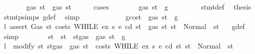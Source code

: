 \begin{isabellebody}
\ \ \ \ \isamarkupfalse%
\ \isamarkupfalse%
\ {\isachardoublequoteopen}gas\ st{}{\isacharprime}{\kern0pt}\ {\isasymle}\ gas\ st{\isachardoublequoteclose}\isanewline
\ \ \ \ \isamarkupfalse%
\ cases\isanewline
\ \ \ \ \ \ \isamarkupfalse%
\ {\isachardoublequoteopen}gas\ st\ {\isasymle}\ g{\isachardoublequoteclose}\isanewline
\ \ \ \ \ \ \isamarkupfalse%
\ {}{\isacharparenleft}{\kern0pt}{}{\isacharparenright}{\kern0pt}\ stmt{\isacharunderscore}{\kern0pt}def\ \isamarkupfalse%
\ {\isacharquery}{\kern0pt}thesis\ \isamarkupfalse%
\ stmt{\isachardot}{\kern0pt}psimps{\isacharparenleft}{\kern0pt}{}{\isacharparenright}{\kern0pt}\ g{\isacharunderscore}{\kern0pt}def\ \isamarkupfalse%
\ simp\isanewline
\ \ \ \ \isamarkupfalse%
\isanewline
\ \ \ \ \ \ \isamarkupfalse%
\ gcost{\isacharcolon}{\kern0pt}\ {\isachardoublequoteopen}{\isasymnot}\ gas\ st\ {\isasymle}\ g{\isachardoublequoteclose}\isanewline
\ \ \ \ \ \ \isamarkupfalse%
\ \isamarkupfalse%
\ l{}{\isacharcolon}{\kern0pt}\ {\isachardoublequoteopen}assert\ Gas\ {\isacharparenleft}{\kern0pt}{\isasymlambda}st{\isachardot}{\kern0pt}\ costs\ {\isacharparenleft}{\kern0pt}WHILE\ ex\ s{}{\isacharparenright}{\kern0pt}\ e\ cd\ st\ {\isacharless}{\kern0pt}\ gas\ st{\isacharparenright}{\kern0pt}\ st\ {\isacharequal}{\kern0pt}\ Normal\ {\isacharparenleft}{\kern0pt}{\isacharparenleft}{\kern0pt}{\isacharparenright}{\kern0pt}{\isacharcomma}{\kern0pt}\ st{\isacharparenright}{\kern0pt}\ {\isachardoublequoteclose}\ \isamarkupfalse%
\ g{\isacharunderscore}{\kern0pt}def\ \isamarkupfalse%
\ simp\isanewline
\ \ \ \ \ \ \isamarkupfalse%
\ st{\isacharprime}{\kern0pt}\ \ {\isachardoublequoteopen}st{\isacharprime}{\kern0pt}\ {\isacharequal}{\kern0pt}\ st{\isasymlparr}gas\ {\isacharcolon}{\kern0pt}{\isacharequal}{\kern0pt}\ gas\ st\ {\isacharminus}{\kern0pt}\ g{\isasymrparr}{\isachardoublequoteclose}\isanewline
\ \ \ \ \ \ \isamarkupfalse%
\ \isamarkupfalse%
\ l{}{\isacharcolon}{\kern0pt}\ {\isachardoublequoteopen}\ modify\ {\isacharparenleft}{\kern0pt}{\isasymlambda}st{\isachardot}{\kern0pt}\ st{\isasymlparr}gas\ {\isacharcolon}{\kern0pt}{\isacharequal}{\kern0pt}\ gas\ st\ {\isacharminus}{\kern0pt}\ costs\ {\isacharparenleft}{\kern0pt}WHILE\ ex\ s{}{\isacharparenright}{\kern0pt}\ e\ cd\ st{\isasymrparr}{\isacharparenright}{\kern0pt}\ st\ {\isacharequal}{\kern0pt}\ Normal\ {\isacharparenleft}{\kern0pt}{\isacharparenleft}{\kern0pt}{\isacharparenright}{\kern0pt}{\isacharcomma}{\kern0pt}\ st{\isacharprime}{\kern0pt}{\isacharparenright}{\kern0pt}{\isachardoublequoteclose}\ \isamarkupfalse%

\end{isabellebody}
